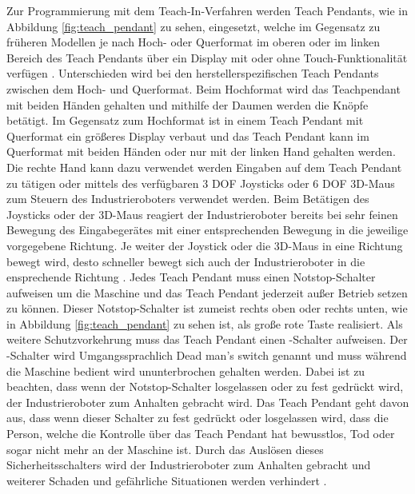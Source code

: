 Zur Programmierung mit dem Teach-In-Verfahren werden Teach Pendants, wie in Abbildung \ref{fig:teach_pendant} zu sehen, eingesetzt, welche im Gegensatz zu früheren Modellen je nach Hoch- oder Querformat im oberen oder im linken Bereich des Teach Pendants über ein Display mit oder ohne Touch-Funktionalität verfügen \cite{nof_handbook_1999}. Unterschieden wird bei den herstellerspezifischen Teach Pendants zwischen dem Hoch- und Querformat. Beim Hochformat wird das Teachpendant mit beiden Händen gehalten und mithilfe der Daumen werden die Knöpfe betätigt. Im Gegensatz zum Hochformat ist in einem Teach Pendant mit Querformat ein größeres Display verbaut und das Teach Pendant kann im Querformat mit beiden Händen oder nur mit der linken Hand gehalten werden. Die rechte Hand kann dazu verwendet werden Eingaben auf dem Teach Pendant zu tätigen oder mittels des verfügbaren 3 DOF Joysticks oder 6 DOF 3D-Maus zum Steuern des Industrieroboters verwendet werden. Beim Betätigen des Joysticks oder der 3D-Maus reagiert der Industrieroboter bereits bei sehr feinen Bewegung des Eingabegerätes mit einer entsprechenden Bewegung in die jeweilige vorgegebene Richtung. Je weiter der Joystick oder die 3D-Maus in eine Richtung bewegt wird, desto schneller bewegt sich auch der Industrieroboter in die ensprechende Richtung \cite[48\psq]{prassler_advances_2004}. Jedes Teach Pendant muss einen Notstop-Schalter aufweisen um die Maschine und das Teach Pendant jederzeit außer Betrieb setzen zu können. Dieser Notstop-Schalter ist zumeist rechts oben oder rechts unten, wie in Abbildung \ref{fig:teach_pendant} zu sehen ist, als große rote Taste realisiert. Als weitere Schutzvorkehrung muss das Teach Pendant einen -Schalter aufweisen. Der -Schalter wird Umgangssprachlich Dead man's switch genannt und muss während die Maschine bedient wird ununterbrochen gehalten werden. Dabei ist zu beachten, dass wenn der Notstop-Schalter losgelassen oder zu fest gedrückt wird, der Industrieroboter zum Anhalten gebracht wird. Das Teach Pendant geht davon aus, dass wenn dieser Schalter zu fest gedrückt oder losgelassen wird, dass die Person, welche die Kontrolle über das Teach Pendant hat bewusstlos, Tod oder sogar nicht mehr an der Maschine ist. Durch das Auslösen dieses Sicherheitsschalters wird der Industrieroboter zum Anhalten gebracht und weiterer Schaden und gefährliche Situationen werden verhindert \cite{noauthor_dead_man_switch_2020}.\\

